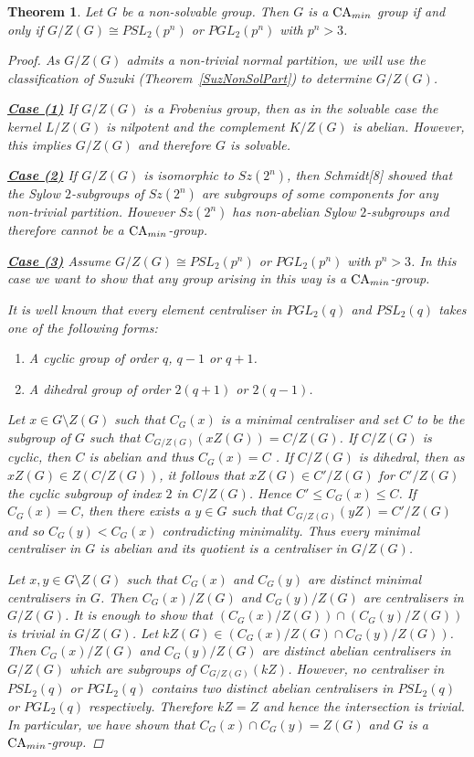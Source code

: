 \documentclass[a4paper,11pt]{article}
\theoremstyle{plain}
\newtheorem{thm}{Theorem}[section]
\numberwithin{thm}{section}
\begin{document}
\begin{thm}\label{NonSolCAminGp}
Let $G$ be a non-solvable group.
Then $G$ is a ${\rm CA}_{min}$ group if and only if  $G/Z(G)\cong PSL_2(p^n)$ or $PGL_2(p^n)$ with $p^n>3$.
\begin{proof}
As $G/Z(G)$ admits a non-trivial normal partition, we will use the classification of Suzuki (Theorem~\ref{SuzNonSolPart}) to determine $G/Z(G)$.

\underline{\bf Case (1)}\newline
If $G/Z(G)$ is a Frobenius group, then as in the solvable case the kernel $L/Z(G)$ is nilpotent and the complement $K/Z(G)$ is abelian.
However, this implies $G/Z(G)$ and therefore $G$ is solvable.

\underline{\bf Case (2)}\newline
If $G/Z(G)$ is isomorphic to $Sz(2^n)$, then Schmidt[8] showed that the Sylow $2$-subgroups of $Sz(2^n)$ are subgroups of some components for any non-trivial partition. 
However $Sz(2^n)$ has non-abelian Sylow $2$-subgroups and therefore cannot be a ${\rm CA}_{min}$-group.

\underline{\bf Case (3)}\newline
Assume $G/Z(G)\cong PSL_2(p^n)$ or $PGL_2(p^n)$ with $p^n>3$.
In this case we want to show that any group arising in this way is a ${\rm CA}_{min}$-group.

It is well known that every element centraliser in $PGL_2(q)$ and $PSL_2(q)$ takes one of the following forms:
\begin{enumerate}
\item A cyclic group of order $q$, $q-1$ or $q+1$.
\item A dihedral group of order $2(q+1)$ or $2(q-1)$.
\end{enumerate}

Let $x\in G\setminus Z(G)$ such that $C_G(x)$ is a minimal centraliser and set $C$ to be the subgroup of $G$ such that $C_{G/Z(G)}(xZ(G))=C/Z(G)$.
If $C/Z(G)$ is cyclic, then $C$ is abelian and thus $C_G(x)=C$ .
If $C/Z(G)$ is dihedral, then as $xZ(G)\in Z(C/Z(G))$, it follows that $xZ(G)\in C'/Z(G)$ for $C'/Z(G)$ the cyclic subgroup of index $2$ in $C/Z(G)$.
Hence $C'\leq C_G(x)\leq C$.
If $C_G(x)=C$, then there exists a $y\in G$ such that $C_{G/Z(G)}(yZ)=C'/Z(G)$ and so $C_G(y)<C_G(x)$ contradicting minimality.
Thus every minimal centraliser in $G$ is abelian and its quotient is a centraliser in $G/Z(G)$.

Let $x,y\in G\setminus Z(G)$ such that $C_G(x)$ and $C_G(y)$ are distinct minimal centralisers in $G$.
Then $C_G(x)/Z(G)$ and $C_G(y)/Z(G)$ are centralisers in $G/Z(G)$.
It is enough to show that $(C_G(x)/Z(G))\cap (C_G(y)/Z(G))$ is trivial in $G/Z(G)$.
Let $kZ(G)\in (C_G(x)/Z(G)\cap C_G(y)/Z(G))$.
Then $C_G(x)/Z(G)$ and $C_G(y)/Z(G)$ are distinct abelian centralisers in $G/Z(G)$ which are subgroups of $C_{G/Z(G)}(kZ)$.
However, no centraliser in $PSL_2(q)$ or $PGL_2(q)$ contains two distinct abelian centralisers in $PSL_2(q)$ or $PGL_2(q)$ respectively.
Therefore $kZ=Z$ and hence the intersection is trivial.
In particular, we have shown that $C_G(x)\cap C_G(y)=Z(G)$ and $G$ is a ${\rm CA}_{min}$-group.
\end{proof}
\end{thm}
\end{document}
